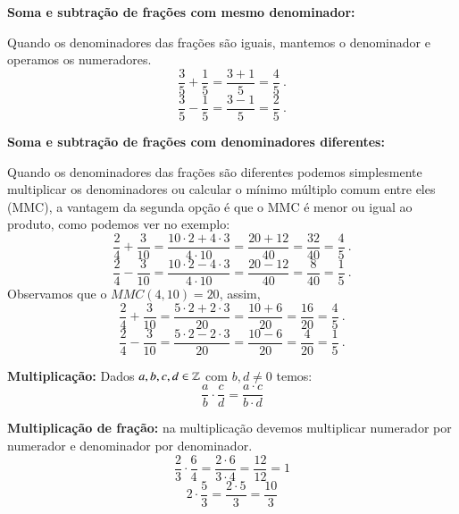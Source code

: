  \vskip0.3cm
 
 \begin{exem}
  \textbf{Soma e subtração de frações com mesmo denominador:}
   
   Quando os denominadores das frações são iguais, mantemos o denominador e operamos os numeradores.
    \vskip0.3cm
   \[\frac{3}{5} + \frac{1}{5}= \frac{3+1}{5}= \frac{4}{5} \ .\]
    \vskip0.3cm
   \[\frac{3}{5} - \frac{1}{5}= \frac{3-1}{5}= \frac{2}{5} \ .\]
 \end{exem}
 
 \begin{exem}
 \textbf{Soma e subtração de frações com denominadores diferentes:}
   
   Quando os denominadores das frações são diferentes podemos simplesmente multiplicar os denominadores ou calcular o mínimo múltiplo comum entre eles (MMC), a vantagem da segunda opção é que o MMC é menor ou igual ao produto, como podemos ver no exemplo:
    \vskip0.3cm
   \[\frac{2}{4} + \frac{3}{10}= \frac{10 \cdot 2 + 4 \cdot 3}{4 \cdot 10}= \frac{20 + 12}{40}= \frac{32}{40}= \frac{4}{5} \ .\]
    \vskip0.3cm
   \[\frac{2}{4} - \frac{3}{10}= \frac{10 \cdot 2 - 4 \cdot 3}{4 \cdot 10}= \frac{20 - 12}{40}= \frac{8}{40}= \frac{1}{5} \ .\]
    \vskip0.3cm
   Observamos que o $MMC(4, 10)= 20$, assim,
    \vskip0.3cm
   \[\frac{2}{4} + \frac{3}{10}= \frac{5 \cdot 2 + 2 \cdot 3}{20}= \frac{10+6}{20}= \frac{16}{20}=\frac{4}{5} \ .\]
    \vskip0.3cm
   \[\frac{2}{4} - \frac{3}{10}= \frac{5 \cdot 2 - 2 \cdot 3}{20}= \frac{10 - 6}{20}= \frac{4}{20}=\frac{1}{5} \ .\]
 \end{exem}

 
 \vskip0.5cm
 
 \colorbox{azul}{
 \begin{minipage}{14.5cm}
 \begin{center}
  \textbf{Multiplicação:} Dados $a, b, c, d \in \mathbb{Z}$ com $b, d \neq 0$ temos:
 \[\frac{a}{b} \cdot \frac{c}{d}= \frac{a \cdot c}{b \cdot d} \]
 \end{center}
 \end{minipage}}
 
 \vskip0.3cm
 \begin{exem}
  \textbf{Multiplicação de fração:} na multiplicação devemos multiplicar numerador por numerador e denominador por denominador.
   \[\frac{2}{3} \cdot \frac{6}{4}= \frac{2 \cdot 6}{3 \cdot 4}= \frac{12}{12}= 1 \]
   \[2 \cdot \frac{5}{3}= \frac{2 \cdot 5}{3}= \frac{10}{3}\]
 \end{exem}

